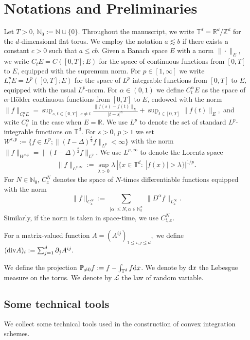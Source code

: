\documentclass[UTF-8,reqno]{amsart}
\numberwithin{equation}{section}
\theoremstyle{definition}
\def\dif{{\mathord{{\rm d}}}}
\def\mN{{\mathbb N}}
\def\mR{{\mathbb R}}
\def\mT{{\mathbb T}}
\def\mZ{{\mathbb Z}}
\def\leq{\leqslant}
\def\div{\mathord{{\rm div}}}
\def\dif{{\mathord{{\rm d}}}}
\def\leq{\leqslant}
\def\div{\mathord{{\rm div}}}
\def\N{\mathbb N} \def\kk{\zeta} \def\m{{\bf m}}
\begin{document}
\section{Notations and Preliminaries}\label{sec:notation}
 Let $T>0$, $\mN_{0}:=\mN\cup \{0\}$. Throughout the manuscript, we write  $\mT^d = \mR^d/\mZ^d$ for the $d$-dimensional flat torus.  
We employ the notation $a\lesssim b$ if there exists a constant $c>0$ such that $a\leq cb$. %
  Given a Banach space $E$ with a norm $\|\cdot\|_E$, we write $C_tE=C([0,T];E)$ for the space of continuous functions from $[0,T]$ to $E$, equipped with the supremum norm. For $p\in [1,\infty]$ we write $L^p_tE=L^p([0,T];E)$ for the space of $L^p$-integrable functions from $[0,T]$ to $E$, equipped with the usual $L^p$-norm.
For $\alpha\in(0,1)$ we  define $C^\alpha_tE$ as the space of $\alpha$-H\"{o}lder continuous functions from $[0,T]$ to $E$, endowed with the norm $\|f\|_{C^\alpha_tE}=\sup_{s,t\in[0,T],s\neq t}\frac{\|f(s)-f(t)\|_E}{|t-s|^\alpha}+\sup_{t\in[0,T]}\|f(t)\|_{E},$   and write  $C_t^\alpha$ in the case when $E=\mathbb{R}$. 
   We use $L^p$ to denote the set of  standard $L^p$-integrable functions on $\mathbb{T}^d$.
For $s>0$, $p>1$ we set $W^{s,p}:=\{f\in L^p; \|(I-\Delta)^{\frac{s}{2}}f\|_{L^p}<\infty\}$ with the norm  $\|f\|_{W^{s,p}}=\|(I-\Delta)^{\frac{s}{2}}f\|_{L^p}$.   We use $L^{p,\infty}$ to denote the Lorentz space
\begin{align*}
\|f\|_{L^{p,\infty}}
:=
\sup_{\lambda>0}
\lambda
\,|\{x\in\mathbb{T}^d:\ |f(x)|>\lambda\}|^{1/p}.
\end{align*}
For $N\in \N_0 $, $C_x^N$ denotes the space of $N$-times differentiable functions equipped with the norm
	$$
	\|f\|_{C_x^N}:=\sum_{\substack{|\alpha|\leq N, \alpha\in\N^{d}_{0} }}\| D^\alpha f\|_{ L^\infty_x}.$$ Similarly, if the norm is taken in space-time, we use $C^{N}_{t,x}$. %
  
   For a matrix-valued function
$
A=(A^{ij})_{1\leq i,j\leq d},
$
we define
$
(\div A)_i:=\sum_{j=1}^d\partial_jA^{ij}.
$

We define  the projection  $\mathbb{P}_{\neq0} f := f -\int_{\mathbb{T}^d} f\dif x$.
We denote by $\dif x$ the Lebesgue measure on the torus.
 We denote by $\mathcal{L}$ the law of  random variable.



\subsection{Some technical tools}\label{tamr}
We collect some technical tools used in the construction of convex integration schemes. 
\end{document}
